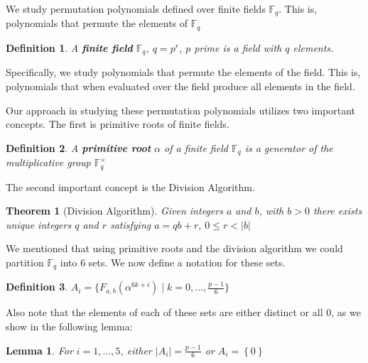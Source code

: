 \documentclass[12pt]{article}
\newtheorem{definition}{Definition}
\newtheorem{lemma}{Lemma}
\newtheorem{theorem}{Theorem}
\begin{document}
We study permutation polynomials defined over finite fields $\mathbb{F}_{q}$. This is, polynomials that permute the elements of $\mathbb{F}_{q}$

\begin{definition}
	A \textbf{finite field} $\mathbb{F}_{q}$, $q=p^{r}$, $p$ prime is a field with $q$ elements.
\end{definition}

Specifically, we study polynomials that permute the elements of the field. This is, polynomials that when evaluated over the field produce all elements in the field.


Our approach in studying these permutation polynomials utilizes two important concepts. The first is primitive roots of finite fields.
\begin{definition}
	A \textbf{primitive root} $\alpha$ of a finite field $\mathbb{F}_{q}$ is a generator of the multiplicative group $\mathbb{F}_{q}^{\times}$
\end{definition}

The second important concept is the Division Algorithm.
\begin{theorem}[Division Algorithm]
	Given integers $a$ and $b$, with $b>0$ there exists unique integers $q$ and $r$ satisfying $a=qb+r$, $0 \leq r < |b|$
\end{theorem}

We mentioned that using primitive roots and the division algorithm we could partition $\mathbb{F}_{q}$ into $6$ sets. We now define a notation for these sets.

\begin{definition}
	$A_{i}=\lbrace F_{a,b}(\alpha^{6k+i}) \mid k=0,...,\frac{p-1}{6}\rbrace$
\end{definition}
Also note that the elements of each of these sets are either distinct or all $0$, as we show in the following lemma:
\pagebreak
\begin{lemma}
	For $i=1,...,5$, either $\left\vert A_{i} \right\vert = \frac{p-1}{6}$ or $A_{i} = \left\{ 0 \right\}$ 
\end{lemma}
\end{document}
